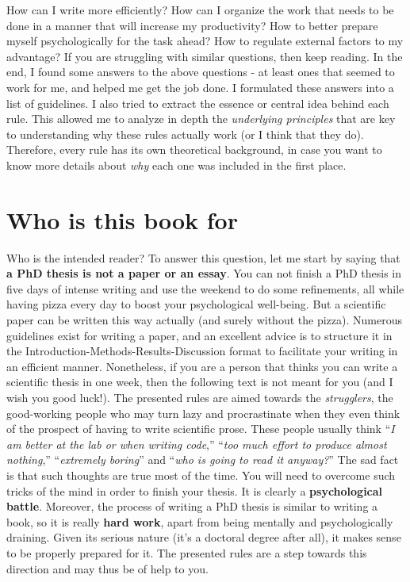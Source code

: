 \documentclass[
  12pt,
  oneside]{book}
\begin{document}
How can I write more efficiently?
How can I organize the work that needs to be done in a manner that will increase my productivity?
How to better prepare myself psychologically for the task ahead?
How to regulate external factors to my advantage?
If you are struggling with similar questions, then keep reading.
In the end, I found some answers to the above questions - at least ones that seemed to work for me, and helped me get the job done.
I formulated these answers into a list of guidelines.
I also tried to extract the essence or central idea behind each rule.
This allowed me to analyze in depth the \emph{underlying principles} that are key to understanding why these rules actually work (or I think that they do).
Therefore, every rule has its own theoretical background, in case you want to know more details about \emph{why} each one was included in the first place.

\hypertarget{who-is-this-book-for}{%
\section*{Who is this book for}\label{who-is-this-book-for}}

Who is the intended reader?
To answer this question, let me start by saying that \textbf{a PhD thesis is not a paper or an essay}.
You can not finish a PhD thesis in five days of intense writing and use the weekend to do some refinements, all while having pizza every day to boost your psychological well-being.
But a scientific paper can be written this way actually (and surely without the pizza).
Numerous guidelines exist for writing a paper, and an excellent advice is to structure it in the Introduction-Methods-Results-Discussion format to facilitate your writing in an efficient manner.
Nonetheless, if you are a person that thinks you can write a scientific thesis in one week, then the following text is not meant for you (and I wish you good luck!).
The presented rules are aimed towards the \emph{strugglers}, the good-working people who may turn lazy and procrastinate when they even think of the prospect of having to write scientific prose.
These people usually think ``\emph{I am better at the lab or when writing code},'' ``\emph{too much effort to produce almost nothing},'' ``\emph{extremely boring}'' and ``\emph{who is going to read it anyway?}''
The sad fact is that such thoughts are true most of the time.
You will need to overcome such tricks of the mind in order to finish your thesis.
It is clearly a \textbf{psychological battle}.
Moreover, the process of writing a PhD thesis is similar to writing a book, so it is really \textbf{hard work}, apart from being mentally and psychologically draining.
Given its serious nature (it's a doctoral degree after all), it makes sense to be properly prepared for it.
The presented rules are a step towards this direction and may thus be of help to you.
\end{document}

